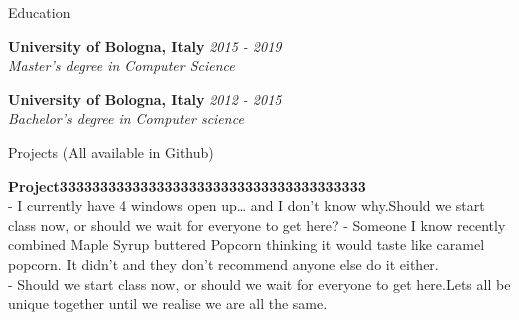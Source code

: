 \documentclass{resume} %
\begin{document}
\begin{rSection}{Education}

{\bf University of Bologna, Italy } \hfill {\em 2015 - 2019} 
\\{ \textit {Master's degree in Computer Science }} 

{\bf University of Bologna, Italy } \hfill {\em 2012 - 2015} 
\\ { \textit {Bachelor's degree in Computer science }} \hfill


\end{rSection}


\begin{rSection}{Projects (All available in Github)}

{\bf Project33333333333333333333333333333333333333}
\\- I currently have 4 windows open up… and I don’t know why.Should we start class now, or should we wait for everyone to get here?
- Someone I know recently combined Maple Syrup  buttered Popcorn thinking it would taste like caramel popcorn. It didn’t and they don’t recommend anyone else do it either.
\\- Should we start class now, or should we wait for everyone to get here.Lets all be unique together until we realise we are all the same.



\end{rSection}
\end{document}
